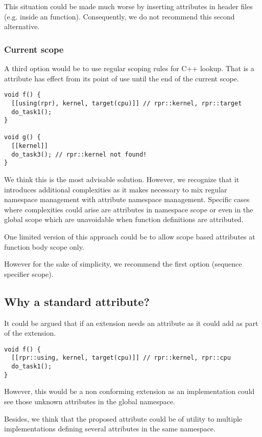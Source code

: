 This situation could be made much worse by inserting  attributes
in header files (e.g. inside an  function). Consequently, we
do not recommend this second alternative.

\subsubsection{Current scope}

A third option would be to use regular scoping rules for C++ lookup. That is
a  attribute has effect from its point of use until the end of
the current scope.

\begin{lstlisting}
void f() {
  [[using(rpr), kernel, target(cpu)]] // rpr::kernel, rpr::target
  do_task1();
}

void g() {
  [[kernel]]
  do_task3(); // rpr::kernel not found!
}
\end{lstlisting}

We think this is the most advisable solution. However, we recognize that it introduces
additional complexities as it makes necessary to mix regular namespace management
with attribute namespace management. Specific cases where complexities could arise
are attributes in namespace scope or even in the global scope 
which are unavoidable when function definitions are attributed.

One limited version of this approach could be to allow scope based 
attributes at function body scope only.

However for the sake of simplicity, we recommend the first option (sequence specifier scope).

\subsection{Why a standard attribute?}

It could be argued that if an extension needs an attribute as  it could add
as part of the extension.

\begin{lstlisting}
void f() {
  [[rpr::using, kernel, target(cpu)]] // rpr::kernel, rpr::cpu
  do_task1();
}
\end{lstlisting}

However, this would be a non conforming extension as an implementation could see those
unknown attributes in the global namespace.

Besides, we think that the proposed  attribute could be of utility to
multiple implementations defining several attributes in the same namespace.
